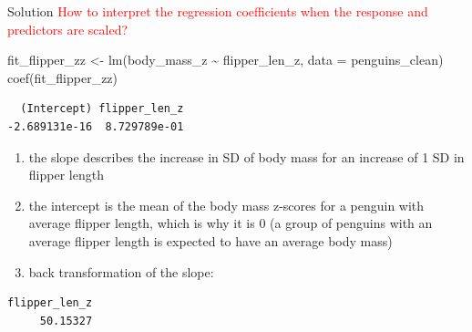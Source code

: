 \documentclass[
  10pt,
  ignorenonframetext,
  aspectratio=169,
  t]{beamer}
\newenvironment{Shaded}{\begin{snugshade}}{\end{snugshade}}
\newcommand{\AttributeTok}[1]{\textcolor[rgb]{0.40,0.45,0.13}{#1}}
\newcommand{\FunctionTok}[1]{\textcolor[rgb]{0.28,0.35,0.67}{#1}}
\newcommand{\NormalTok}[1]{\textcolor[rgb]{0.00,0.23,0.31}{#1}}
\newcommand{\OtherTok}[1]{\textcolor[rgb]{0.00,0.23,0.31}{#1}}
\newcommand{\SpecialCharTok}[1]{\textcolor[rgb]{0.37,0.37,0.37}{#1}}
\newcommand{\StringTok}[1]{\textcolor[rgb]{0.13,0.47,0.30}{#1}}
\providecommand{\tightlist}{%
  \setlength{\itemsep}{0pt}\setlength{\parskip}{0pt}}
\begin{document}
\begin{frame}[fragile]{Solution}
\protect{}\label{solution-1}
\textcolor{red}{How to interpret the regression coefficients when the response and predictors are scaled?}

\footnotesize

\begin{Shaded}
\begin{Highlighting}[]
\NormalTok{fit\_flipper\_zz }\OtherTok{\textless{}{-}} \FunctionTok{lm}\NormalTok{(body\_mass\_z }\SpecialCharTok{\textasciitilde{}}\NormalTok{ flipper\_len\_z, }\AttributeTok{data =}\NormalTok{ penguins\_clean)}
\FunctionTok{coef}\NormalTok{(fit\_flipper\_zz)}
\end{Highlighting}
\end{Shaded}

\begin{verbatim}
  (Intercept) flipper_len_z 
-2.689131e-16  8.729789e-01 
\end{verbatim}

\normalsize

\begin{enumerate}
\tightlist
\item
  the slope describes the increase in SD of body mass for an increase of
  1 SD in flipper length
\item
  the intercept is the mean of the body mass z-scores for a penguin with
  average flipper length, which is why it is 0 (a group of penguins with
  an average flipper length is expected to have an average body mass)
\item
  back transformation of the slope:
\end{enumerate}

\scriptsize

\begin{Shaded}
\end{Shaded}

\begin{verbatim}
flipper_len_z 
     50.15327 
\end{verbatim}

\normalsize
\end{frame}
\end{document}
